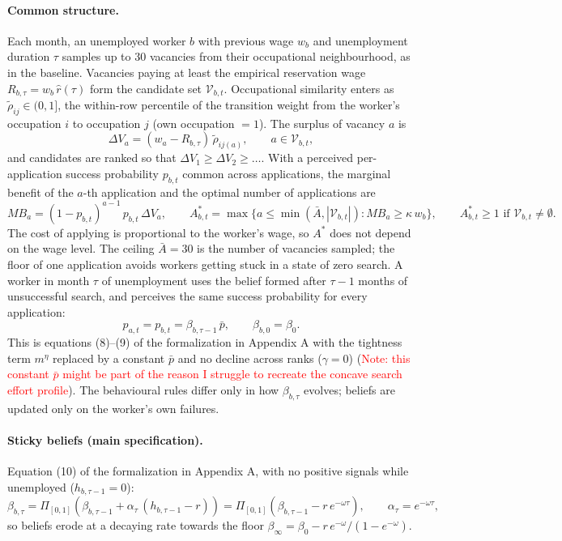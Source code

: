 \documentclass[11pt]{article}
\begin{document}
\paragraph{Common structure.}
Each month, an unemployed worker $b$ with previous wage $w_b$ and unemployment duration $\tau$ samples up to 30
vacancies from their occupational neighbourhood, as in the baseline. Vacancies paying at least the empirical
reservation wage $R_{b,\tau} = w_b\,\hat r(\tau)$ form the candidate set $\mathcal{V}_{b,t}$. Occupational
similarity enters as $\tilde\rho_{ij}\in(0,1]$, the within-row percentile of the transition weight from the worker's
occupation $i$ to occupation $j$ (own occupation $=1$). The surplus of vacancy $a$ is
\begin{equation}
\Delta V_a = (w_a - R_{b,\tau})\,\tilde\rho_{i j(a)}, \qquad a \in \mathcal{V}_{b,t},
\end{equation}
and candidates are ranked so that $\Delta V_1 \ge \Delta V_2 \ge \dots$. With a perceived per-application success
probability $p_{b,t}$ common across applications, the marginal benefit of the $a$-th application and the optimal
number of applications are
\begin{equation}
MB_a = (1-p_{b,t})^{a-1}\,p_{b,t}\,\Delta V_a, \qquad
A^*_{b,t} = \max\bigl\{a \le \min(\bar A, |\mathcal{V}_{b,t}|) : MB_a \ge \kappa\, w_b\bigr\}, \qquad
A^*_{b,t} \ge 1 \text{ if } \mathcal{V}_{b,t} \neq \emptyset .
\end{equation}
The cost of applying is proportional to the worker's wage, so $A^*$ does not depend on the wage level. The ceiling $\bar A = 30$ is
the number of vacancies sampled; the floor of one application avoids workers getting stuck in a state of zero search. A worker in month $\tau$ of unemployment uses the belief formed after $\tau-1$
months of unsuccessful search, and perceives the same success probability for every application:
\begin{equation}
p_{a,t} = p_{b,t} = \beta_{b,\tau-1}\,\bar p, \qquad \beta_{b,0} = \beta_0 .
\end{equation}
This is equations (8)--(9) of the formalization in Appendix A with the tightness term $m^{\eta}$ replaced by a constant $\bar p$
and no decline across ranks ($\gamma = 0$) (\textcolor{red}{Note: this constant $\bar p$ might be part of the reason I struggle to recreate the concave search effort profile}). The
behavioural rules differ only in how $\beta_{b,\tau}$ evolves; beliefs are updated only on the worker's own failures.

\paragraph{Sticky beliefs (main specification).}
Equation (10) of the formalization in Appendix A, with no positive signals while unemployed ($h_{b,\tau-1} = 0$):
\begin{equation}
\beta_{b,\tau} = \Pi_{[0,1]}\!\left(\beta_{b,\tau-1} + \alpha_\tau\,(h_{b,\tau-1} - r)\right)
= \Pi_{[0,1]}\!\left(\beta_{b,\tau-1} - r\,e^{-\omega\tau}\right), \qquad \alpha_\tau = e^{-\omega\tau},
\end{equation}
so beliefs erode at a decaying rate towards the floor $\beta_\infty = \beta_0 - r\,e^{-\omega}/(1-e^{-\omega})$.
\end{document}
